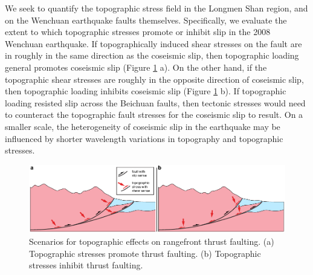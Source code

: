 \documentclass[twocolumn,jgrga]{AGUTeX}
\begin{document}
\begin{article}
We seek to quantify the topographic stress field in the Longmen Shan region,
and on the Wenchuan earthquake faults themselves. Specifically, we evaluate the
extent to which topographic stresses promote or inhibit slip in the 2008
Wenchuan earthquake. If topographically induced shear stresses on the fault are
in roughly in the same direction as the coseismic slip, then topographic
loading general promotes coseismic slip (Figure \ref{fig:topo_fault_scenarios}
a). On the other hand, if the topographic shear stresses are roughly in the
opposite direction of coseismic slip, then topographic loading inhibits
coseismic slip (Figure \ref{fig:topo_fault_scenarios} b). If topographic
loading resisted slip across the Beichuan faults, then tectonic stresses would
need to counteract the topographic fault stresses for the coseismic slip to
result. On a smaller scale, the heterogeneity of coseismic slip in the
earthquake may be influenced by shorter wavelength variations in topography and
topographic stresses.

\begin{figure}[t!] \centering
    \includegraphics[width=40pc]{../figures/topo_stress_possibilities.pdf}
    \caption{Scenarios for topographic effects on rangefront thrust faulting.
        (a) Topographic stresses promote thrust faulting. (b) Topographic
        stresses inhibit thrust faulting.} \label{fig:topo_fault_scenarios}
    \end{figure}


\end{article}
\end{document}
